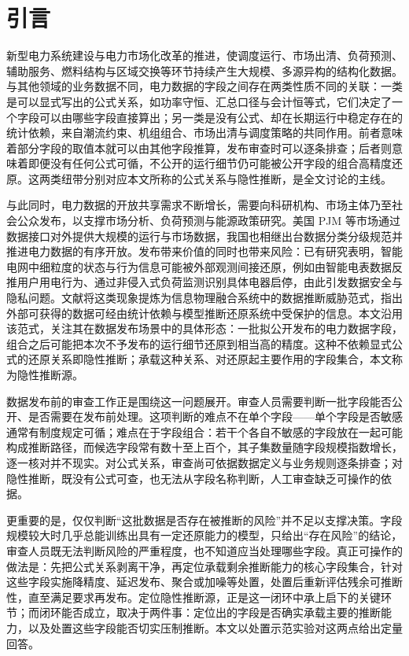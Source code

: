 \documentclass[UTF8,zihao=5,twoside]{ctexart}
\begin{document}
\section{引言}

新型电力系统建设与电力市场化改革的推进，使调度运行、市场出清、负荷预测、辅助服务、燃料结构与区域交换等环节持续产生大规模、多源异构的结构化数据\cite{ref-liu-cps,ref-ma-pjm}。与其他领域的业务数据不同，电力数据的字段之间存在两类性质不同的关联：一类是可以显式写出的公式关系，如功率守恒、汇总口径与会计恒等式，它们决定了一个字段可以由哪些字段直接算出；另一类是没有公式、却在长期运行中稳定存在的统计依赖，来自潮流约束、机组组合、市场出清与调度策略的共同作用。前者意味着部分字段的取值本就可以由其他字段推算，发布审查时可以逐条排查；后者则意味着即便没有任何公式可循，不公开的运行细节仍可能被公开字段的组合高精度还原。这两类纽带分别对应本文所称的公式关系与隐性推断，是全文讨论的主线。

与此同时，电力数据的开放共享需求不断增长，需要向科研机构、市场主体乃至社会公众发布，以支撑市场分析、负荷预测与能源政策研究\cite{ref-zhu-sharing}。美国 PJM 等市场通过数据接口对外提供大规模的运行与市场数据\cite{ref-ma-pjm,ref-pjm-dataminer}，我国也相继出台数据分类分级规范并推进电力数据的有序开放\cite{ref-gbt-classify}。发布带来价值的同时也带来风险：已有研究表明，智能电网中细粒度的状态与行为信息可能被外部观测间接还原，例如由智能电表数据反推用户用电行为\cite{ref-sankar,ref-giaconi}、通过非侵入式负荷监测识别具体电器启停\cite{ref-chen-privacy,ref-wang-meter}，由此引发数据安全与隐私问题\cite{ref-adewole,ref-zhang-sgcc}。文献\cite{ref-liu-data-inference}将这类现象提炼为信息物理融合系统中的数据推断威胁范式，指出外部可获得的数据可经由统计依赖与模型推断还原系统中受保护的信息。本文沿用该范式，关注其在数据发布场景中的具体形态：一批拟公开发布的电力数据字段，组合之后可能把本次不予发布的运行细节还原到相当高的精度。这种不依赖显式公式的还原关系即隐性推断；承载这种关系、对还原起主要作用的字段集合，本文称为隐性推断源。

数据发布前的审查工作正是围绕这一问题展开。审查人员需要判断一批字段能否公开、是否需要在发布前处理。这项判断的难点不在单个字段——单个字段是否敏感通常有制度规定可循；难点在于字段组合：若干个各自不敏感的字段放在一起可能构成推断路径，而候选字段常有数十至上百个，其子集数量随字段规模指数增长，逐一核对并不现实。对公式关系，审查尚可依据数据定义与业务规则逐条排查；对隐性推断，既没有公式可查，也无法从字段名称判断，人工审查缺乏可操作的依据。

更重要的是，仅仅判断“这批数据是否存在被推断的风险”并不足以支撑决策。字段规模较大时几乎总能训练出具有一定还原能力的模型，只给出“存在风险”的结论，审查人员既无法判断风险的严重程度，也不知道应当处理哪些字段。真正可操作的做法是：先把公式关系剥离干净，再定位承载剩余推断能力的核心字段集合，针对这些字段实施降精度、延迟发布、聚合或加噪等处置，处置后重新评估残余可推断性，直至满足要求再发布。定位隐性推断源，正是这一闭环中承上启下的关键环节；而闭环能否成立，取决于两件事：定位出的字段是否确实承载主要的推断能力，以及处置这些字段能否切实压制推断。本文以处置示范实验对这两点给出定量回答。
\end{document}
